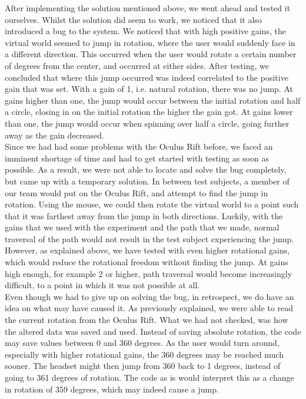 After implementing the solution mentioned above, we went ahead and tested it ourselves.
Whilst the solution did seem to work, we noticed that it also introduced a bug to the system.
We noticed that with high positive gains, the virtual world seemed to jump in rotation, where the user would suddenly face in a different direction.
This occurred when the user would rotate a certain number of degrees from the center, and occurred at either sides.
After testing, we concluded that where this jump occurred was indeed correlated to the positive gain that was set.
With a gain of 1, i.e. natural rotation, there was no jump.
At gains higher than one, the jump would occur between the initial rotation and half a circle, closing in on the initial rotation the higher the gain got.
At gains lower than one, the jump would occur when spinning over half a circle, going further away as the gain decreased. \\
Since we had had some problems with the Oculus Rift before, we faced an imminent shortage of time and had to get started with testing as soon as possible.
As a result, we were not able to locate and solve the bug completely, but came up with a temporary solution.
In between test subjects, a member of our team would put on the Oculus Rift, and attempt to find the jump in rotation.
Using the mouse, we could then rotate the virtual world to a point such that it was farthest away from the jump in both directions.
Luckily, with the gains that we used with the experiment and the path that we made, normal traversal of the path would not result in the test subject experiencing the jump.
However, as explained above, we have tested with even higher rotational gains, which would reduce the rotational freedom without finding the jump.
At gains high enough, for example 2 or higher, path traversal would become increasingly difficult, to a point in which it was not possible at all. \\
Even though we had to give up on solving the bug, in retrospect, we do have an idea on what may have caused it.
As previously explained, we were able to read the current rotation from the Oculus Rift.
What we had not checked, was how the altered data was saved and used.
Instead of saving absolute rotation, the code may save values between 0 and 360 degrees.
As the user would turn around, especially with higher rotational gains, the 360 degrees may be reached much sooner.
The headset might then jump from 360 back to 1 degrees, instead of going to 361 degrees of rotation.
The code as is would interpret this as a change in rotation of 359 degrees, which may indeed cause a jump.
